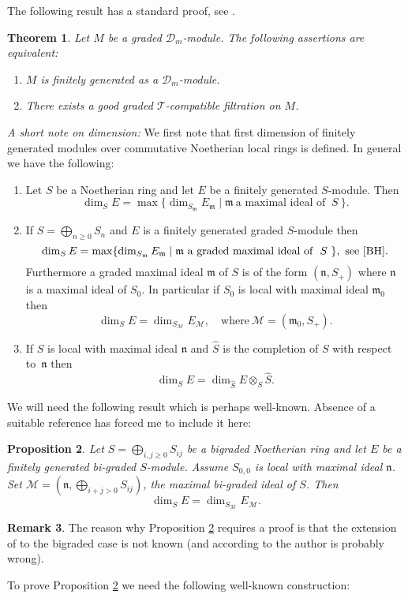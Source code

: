 \documentclass{amsart}
\newcommand{\wrt}{with respect to}
\newcommand{\D}{\mathcal{D} }
\newcommand{\T}{\mathcal{T} }
\newcommand{\n}{\mathfrak{n} }
\newcommand{\m}{\mathfrak{m} }
\newcommand{\M}{\mathcal{M} }
\theoremstyle{plain}
\newtheorem{theorem}{Theorem}[section]
\newtheorem{proposition}[theorem]{Proposition}
\theoremstyle{definition}
\newtheorem{remark}[theorem]{Remark}
\theoremstyle{remark}
\begin{document}
The following result has a standard proof, see \cite[2.6, 2.7]{Bjork}.
\begin{theorem}\label{fin-gen}
Let $M$ be a graded $\D_m$-module. The following assertions are equivalent:
\begin{enumerate}[\rm (1)]
 \item $M$ is finitely generated as a $\D_m$-module.
 \item There exists a good graded $\T$-compatible filtration on $M$.
\end{enumerate}
\end{theorem}

\s \label{short-dim} \emph{A short note on dimension:} We first note that first  dimension of finitely generated modules over commutative  Noetherian local rings is defined.
In general we have the following:
\begin{enumerate}
\item
Let $S$ be a Noetherian ring and let $E$ be a finitely generated $S$-module. Then
\[
\dim_S E = \max \{ \dim_{S_\m} E_\m \mid \m \ \text{a maximal ideal of } \ S \ \}.
\]
\item
If $S = \bigoplus_{n \geq 0} S_n$ and $E$ is a finitely generated  graded $S$-module then
\[
\dim_S E = \max \{ \dim_{S_\m} E_\m \mid \m \ \text{a  graded maximal ideal of } \ S \ \}, \ \text{see \cite[1.5.8]{BH}}.
\]
Furthermore a graded maximal ideal $\m$ of $S$ is of the form $(\n, S_+)$ where 
$\n$ is a maximal ideal of $S_0$. In particular if $S_0$ is local with maximal ideal $\m_0$ then
\[
\dim_S E = \dim_{S_\mathcal{M}} E_{\mathcal{M}}, \quad \text{where} \ \mathcal{M} = (\m_0, S_+).
\]
\item 
If $S$ is local with maximal ideal $\n$ and $\widehat{S}$ is the completion of $S$ \wrt \ $\n$ then
\[
\dim_S E = \dim_{\widehat{S}} E\otimes_S \widehat{S}.
\]
\end{enumerate}

We will need the following result which is perhaps well-known. Absence of a suitable reference has forced me to include it here:
\begin{proposition}\label{bi-graded-dim}
Let $S = \bigoplus_{i,j \geq 0} S_{ij}$ be a bigraded Noetherian ring and let $E$ be a finitely generated bi-graded $S$-module. Assume $S_{0,0}$ is local with maximal ideal $\n$. Set $\mathcal{M} = (\n , \bigoplus_{i+j >0} S_{ij})$, the maximal bi-graded ideal of $S$. Then
\[
\dim_S E = \dim_{S_\mathcal{M}} E_\mathcal{\M}.
\]
\end{proposition}
\begin{remark}
The reason why Proposition \ref{bi-graded-dim} requires a proof is that the 
extension of \cite[1.5.8]{BH} to the bigraded case is not known (and according to the author is probably wrong).
\end{remark}
\s \label{tot} To prove Proposition \ref{bi-graded-dim} we need the following well-known construction: 
\end{document}
